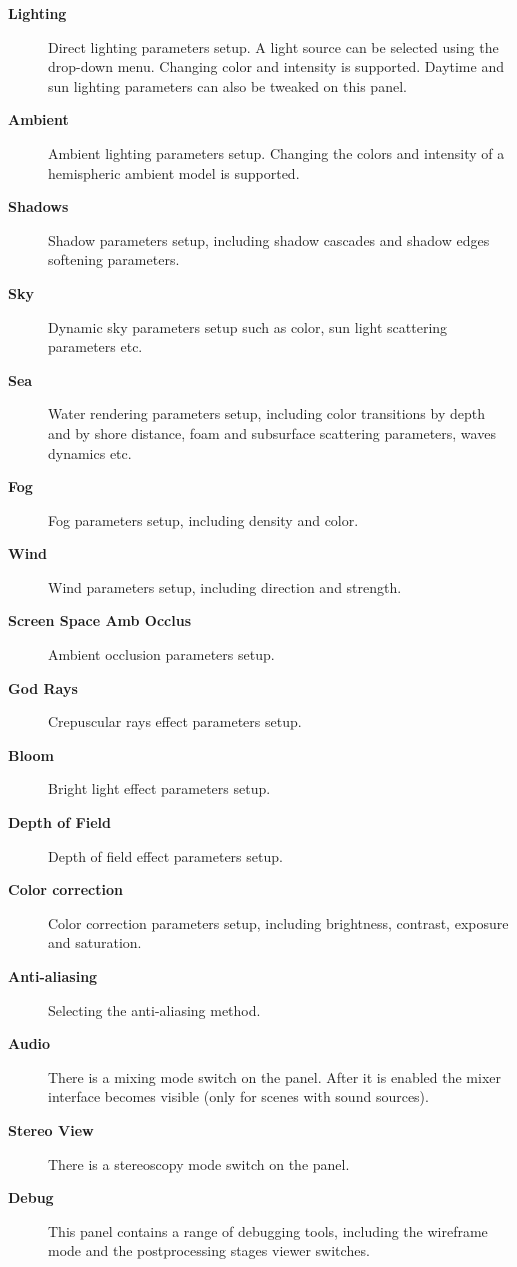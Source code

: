 \documentclass[a4paper,12pt,oneside]{sphinxmanual}
\begin{document}
\begin{description}
\item[{\textbf{Lighting}}] \leavevmode
Direct lighting parameters setup. A light source can be selected using the drop-down menu. Changing color and intensity is supported. Daytime and sun lighting parameters can also be tweaked on this panel.

\item[{\textbf{Ambient}}] \leavevmode
Ambient lighting parameters setup. Changing the colors and intensity of a hemispheric ambient model is supported.

\item[{\textbf{Shadows}}] \leavevmode
Shadow parameters setup, including shadow cascades and shadow edges softening parameters.

\item[{\textbf{Sky}}] \leavevmode
Dynamic sky parameters setup such as color, sun light scattering parameters etc.

\item[{\textbf{Sea}}] \leavevmode
Water rendering parameters setup, including color transitions by depth and by shore distance, foam and subsurface scattering parameters, waves dynamics etc.

\item[{\textbf{Fog}}] \leavevmode
Fog parameters setup, including density and color.

\item[{\textbf{Wind}}] \leavevmode
Wind parameters setup, including direction and strength.

\item[{\textbf{Screen Space Amb Occlus}}] \leavevmode
Ambient occlusion parameters setup.

\item[{\textbf{God Rays}}] \leavevmode
Crepuscular rays effect parameters setup.

\item[{\textbf{Bloom}}] \leavevmode
Bright light effect parameters setup.

\item[{\textbf{Depth of Field}}] \leavevmode
Depth of field effect parameters setup.

\item[{\textbf{Color correction}}] \leavevmode
Color correction parameters setup, including brightness, contrast, exposure and saturation.

\item[{\textbf{Anti-aliasing}}] \leavevmode
Selecting the anti-aliasing method.

\item[{\textbf{Audio}}] \leavevmode
There is a mixing mode switch on the panel. After it is enabled the mixer interface becomes visible (only for scenes with sound sources).

\item[{\textbf{Stereo View}}] \leavevmode
There is a stereoscopy mode switch on the panel.

\item[{\textbf{Debug}}] \leavevmode
This panel contains a range of debugging tools, including the wireframe mode and the postprocessing stages viewer switches.

\end{description}
\end{document}
